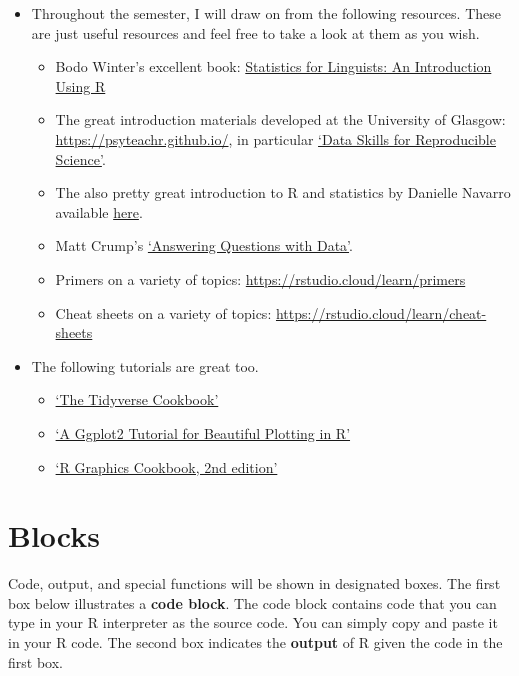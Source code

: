 \documentclass[
]{book}
\providecommand{\tightlist}{%
  \setlength{\itemsep}{0pt}\setlength{\parskip}{0pt}}
\begin{document}
\begin{itemize}
\tightlist
\item
  Throughout the semester, I will draw on from the following resources. These are just useful resources and feel free to take a look at them as you wish.

  \begin{itemize}
  \tightlist
  \item
    Bodo Winter's excellent book: \href{https://www.routledge.com/Statistics-for-Linguists-An-Introduction-Using-R/Winter/p/book/9781138056091}{Statistics for Linguists: An Introduction Using R}
  \item
    The great introduction materials developed at the University of Glasgow: \url{https://psyteachr.github.io/}, in particular \href{https://psyteachr.github.io/msc-data-skills/}{`Data Skills for Reproducible Science'}.
  \item
    The also pretty great introduction to R and statistics by Danielle Navarro available \href{https://learningstatisticswithr.com}{here}.
  \item
    Matt Crump's \href{https://crumplab.github.io/statistics/}{`Answering Questions with Data'}.
  \item
    Primers on a variety of topics: \url{https://rstudio.cloud/learn/primers}
  \item
    Cheat sheets on a variety of topics: \url{https://rstudio.cloud/learn/cheat-sheets}
  \end{itemize}
\item
  The following tutorials are great too.

  \begin{itemize}
  \tightlist
  \item
    \href{https://rstudio-education.github.io/tidyverse-cookbook/}{`The Tidyverse Cookbook'}
  \item
    \href{https://cedricscherer.netlify.app/2019/08/05/a-ggplot2-tutorial-for-beautiful-plotting-in-r/}{`A Ggplot2 Tutorial for Beautiful Plotting in R'}
  \item
    \href{https://r-graphics.org/}{`R Graphics Cookbook, 2nd edition'}
  \end{itemize}
\end{itemize}

\section{Blocks}\label{blocks}

Code, output, and special functions will be shown in designated boxes. The first box below illustrates a \textbf{code block}. The code block contains code that you can type in your R interpreter as the source code. You can simply copy and paste it in your R code. The second box indicates the \textbf{output} of R given the code in the first box.
\end{document}
